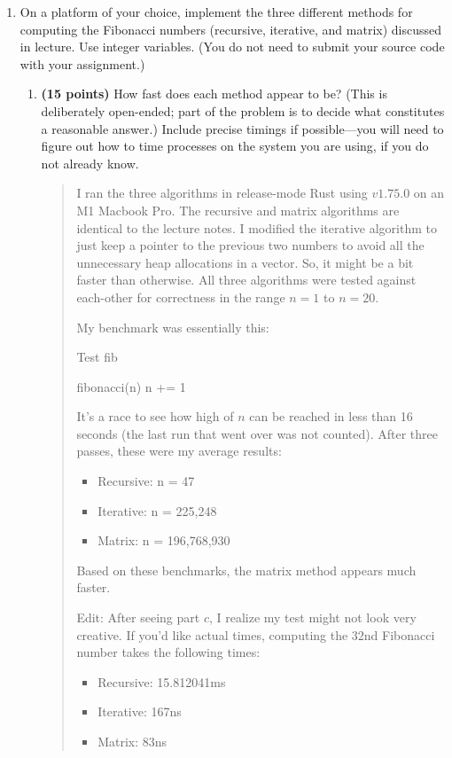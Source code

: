 \documentclass[11pt]{article}
\begin{document}
\begin{enumerate}[leftmargin=*]
\item
On a platform of your choice, implement the three different methods for computing the Fibonacci
numbers (recursive, iterative, and matrix) discussed in lecture. Use integer variables. (You do not need to submit your source code with your assignment.)
\begin{enumerate}
\item
{\bf (15 points)}
How fast does
each method appear to be? (This is deliberately open-ended; part of the problem is to decide what constitutes a reasonable answer.)
Include precise timings if possible---you will need to figure out how to time processes on the system
you are using, if you do not already know.
\begin{quote}
  \color{purple}
  I ran the three algorithms in release-mode Rust using $v1.75.0$ on an M1 Macbook Pro. The recursive and matrix algorithms are identical to the lecture notes. I modified the iterative algorithm to just keep a pointer to the previous two numbers to avoid all the unnecessary heap allocations in a vector. So, it might be a bit faster than otherwise. All three algorithms were tested against each-other for correctness in the range $n = 1$ to $n = 20$. 

  \medskip
  My benchmark was essentially this:
  \begin{algorithm}
  \caption{Test fib}
  \begin{algorithmic}
          \STATE fibonacci(n)
          \STATE n += 1
      \ENDFOR
  \ENDFOR
  \end{algorithmic}
  \end{algorithm}

  It's a race to see how high of $n$ can be reached in less than 16 seconds (the last run that went over was not counted). After three passes, these were my average results:
  \begin{itemize}
    \item Recursive: n = 47
    \item Iterative: n = 225,248
    \item Matrix: n = 196,768,930
  \end{itemize}

  Based on these benchmarks, the matrix method appears much faster. 
  
  \medskip
  Edit: After seeing part $c$, I realize my test might not look very creative. If you'd like actual times, computing the $32$nd Fibonacci number takes the following times:
  \begin{itemize}
    \item Recursive: 15.812041ms
    \item Iterative: 167ns
    \item Matrix: 83ns
  \end{itemize}


\end{quote}
\end{enumerate}
\end{enumerate}
\end{document}
